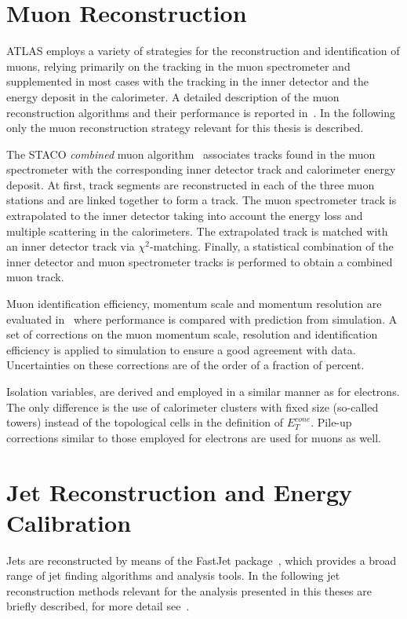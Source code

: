 \section{Muon Reconstruction}\label{sec:muon}
ATLAS employs a variety of strategies for the reconstruction and identification of muons, relying primarily on the
tracking in the muon spectrometer and supplemented in most cases with the tracking in the inner detector and the energy deposit in the calorimeter.
 A detailed description of the muon reconstruction algorithms and their performance is reported in~\cite{AtlasCSCBook}.
In the following only the muon reconstruction strategy relevant for this thesis is described.

The STACO \emph{combined} muon algorithm~\cite{staco} associates tracks found in the
muon spectrometer with the corresponding inner detector track and calorimeter energy deposit.
At first,  track segments are reconstructed in each of the three
muon stations and are linked together to form a track. The muon spectrometer track is
extrapolated to the inner detector taking into account the energy loss and multiple scattering in the calorimeters.
The extrapolated track is  matched with an inner detector track via $\chi^2$-matching. Finally,
a statistical combination of the inner detector and muon spectrometer tracks is performed to obtain a combined muon track. 

Muon identification efficiency, momentum scale and momentum resolution are evaluated in~\cite{muoneffres} where 
performance is compared with prediction from simulation. A set of corrections on the muon momentum scale, resolution and identification efficiency 
is applied to simulation to ensure a good agreement with data. Uncertainties on these corrections are of the order of a fraction of percent.

Isolation variables, are derived and employed in a similar manner  as  for electrons. The only difference
is the use of calorimeter clusters with fixed size (so-called towers) instead of the topological cells 
in the definition of $E_T^{cone}$. Pile-up corrections similar to those employed for electrons are used for muons as well.  



\section{Jet Reconstruction and Energy Calibration}
Jets are reconstructed  by means of the FastJet package~\cite{fastjet}, 
which provides a broad range of jet finding algorithms and analysis tools. 
In the following jet reconstruction methods relevant for the
analysis presented in this theses are briefly described, for more detail see~\cite{AtlasCSCBook}.

